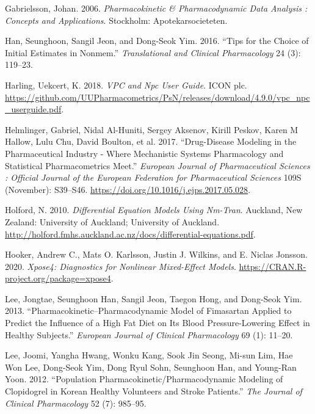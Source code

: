 \documentclass[
  10pt,
  krantz2,
  a4paper]{krantz}
\newlength{\cslhangindent}
\newenvironment{cslreferences}%
  {\setlength{\parindent}{0pt}%
  \everypar{\setlength{\hangindent}{\cslhangindent}}\ignorespaces}%
  {\par}
\theoremstyle{definition}
\theoremstyle{definition}
\theoremstyle{definition}
\theoremstyle{remark}
\begin{document}
\begin{cslreferences}
\leavevmode\hypertarget{ref-gabrielsson}{}%
Gabrielsson, Johan. 2006. \emph{Pharmacokinetic \& Pharmacodynamic Data Analysis : Concepts and Applications}. Stockholm: Apotekarsocieteten.

\leavevmode\hypertarget{ref-han2016tips}{}%
Han, Seunghoon, Sangil Jeon, and Dong-Seok Yim. 2016. ``Tips for the Choice of Initial Estimates in Nonmem.'' \emph{Translational and Clinical Pharmacology} 24 (3): 119--23.

\leavevmode\hypertarget{ref-vpcnpc}{}%
Harling, Uekcert, K. 2018. \emph{VPC and Npc User Guide}. ICON plc. \url{https://github.com/UUPharmacometrics/PsN/releases/download/4.9.0/vpc_npc_userguide.pdf}.

\leavevmode\hypertarget{ref-helmlinger2017drug}{}%
Helmlinger, Gabriel, Nidal Al-Huniti, Sergey Aksenov, Kirill Peskov, Karen M Hallow, Lulu Chu, David Boulton, et al. 2017. ``Drug-Disease Modeling in the Pharmaceutical Industry - Where Mechanistic Systems Pharmacology and Statistical Pharmacometrics Meet.'' \emph{European Journal of Pharmaceutical Sciences : Official Journal of the European Federation for Pharmaceutical Sciences} 109S (November): S39--S46. \url{https://doi.org/10.1016/j.ejps.2017.05.028}.

\leavevmode\hypertarget{ref-nickholford}{}%
Holford, N. 2010. \emph{Differential Equation Models Using Nm-Tran}. Auckland, New Zealand: University of Auckland; University of Auckland. \url{http://holford.fmhs.auckland.ac.nz/docs/differential-equations.pdf}.

\leavevmode\hypertarget{ref-R-xpose4}{}%
Hooker, Andrew C., Mats O. Karlsson, Justin J. Wilkins, and E. Niclas Jonsson. 2020. \emph{Xpose4: Diagnostics for Nonlinear Mixed-Effect Models}. \url{https://CRAN.R-project.org/package=xpose4}.

\leavevmode\hypertarget{ref-lee2013pharmacokinetic}{}%
Lee, Jongtae, Seunghoon Han, Sangil Jeon, Taegon Hong, and Dong-Seok Yim. 2013. ``Pharmacokinetic--Pharmacodynamic Model of Fimasartan Applied to Predict the Influence of a High Fat Diet on Its Blood Pressure-Lowering Effect in Healthy Subjects.'' \emph{European Journal of Clinical Pharmacology} 69 (1): 11--20.

\leavevmode\hypertarget{ref-lee2012population}{}%
Lee, Joomi, Yangha Hwang, Wonku Kang, Sook Jin Seong, Mi-sun Lim, Hae Won Lee, Dong-Seok Yim, Dong Ryul Sohn, Seunghoon Han, and Young-Ran Yoon. 2012. ``Population Pharmacokinetic/Pharmacodynamic Modeling of Clopidogrel in Korean Healthy Volunteers and Stroke Patients.'' \emph{The Journal of Clinical Pharmacology} 52 (7): 985--95.


\end{cslreferences}
\end{document}
